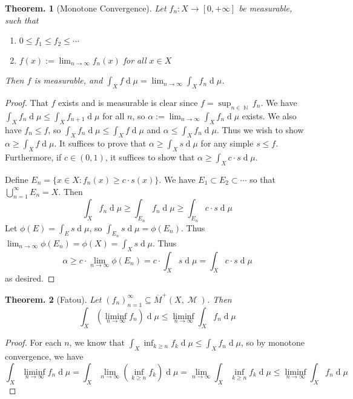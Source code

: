 \documentclass[11pt, a4paper]{memoir}
\DeclareMathOperator{\N}{{\mathbb{N}}}
\newcommand{\ol}[1]{\ensuremath{\overline{#1}}}
\theoremstyle{change}
\newtheorem{theorem}{Theorem.}[section]
\theoremstyle{plain}
\theoremstyle{nonumberplain}
\newtheorem{proof}{Proof}
\DeclareMathOperator{\M}{{\mathcal{M}}}
\renewcommand{\d}[1]{\ensuremath{\operatorname{d}\!{#1}}}
\numberwithin{equation}{section}
\begin{document}
\begin{theorem}[Monotone Convergence]
    Let $f_n:X\to[0,+\infty]$ be measurable, such that
    \begin{enumerate}[nolistsep, label=(\roman*)]
        \item $0\leq f_1\leq f_2\leq\cdots$
        \item $f(x):=\lim_{n\to\infty} f_n(x)$ for all $x\in X$
    \end{enumerate}
    Then $f$ is measurable, and $\int_X f\d{\mu}=\lim_{n\to\infty}\int_X f_n\d{\mu}$.
\end{theorem}
\begin{proof}
    That $f$ exists and is measurable is clear since $f=\sup_{n\in\N}f_n$.
    We have $\int_X f_n\d{\mu}\leq \int_X f_{n+1}\d{\mu}$ for all $n$, so $\alpha:=\lim_{n\to\infty}\int_X f_n \d{\mu}$ exists.
    We also have $f_n\leq f$, so $\int_X f_n\d{\mu}\leq \int_X f\d{\mu}$ and $\alpha\leq\int_X f_n\d{\mu}$.
    Thus we wish to show $\alpha\geq \int_Xf\d{\mu}$.
    It suffices to prove that $\alpha\geq\int_X s\d{\mu}$ for any simple $s\leq f$.
    Furthermore, if $c\in(0,1)$, it suffices to show that $\alpha\geq\int_X c\cdot s\d{\mu}$.

    Define $E_n=\{x\in X:f_n(x)\geq c\cdot s(x)\}$.
    We have $E_1\subset E_2\subset\cdots$ so that $\bigcup\limits_{n=1}^\infty E_n=X$.
    Then
    \begin{equation*}
        \int_X f_n\d{\mu} \geq \int_{E_n} f_n\d{\mu}\geq \int_{E_n} c\cdot s\d{\mu}
    \end{equation*}
    Let $\phi(E)=\int_E s\d{\mu}$, so $\int_{E_n}s\d{\mu}=\phi(E_n)$.
    Thus $\lim_{n\to\infty}\phi(E_n)=\phi(X)=\int_X s\d{\mu}$.
    Thus
    \begin{equation*}
        \alpha\geq c\cdot \lim_{n\to\infty}\phi(E_n)=c\cdot\int_X s\d{\mu}=\int_X c\cdot s\d{\mu}
    \end{equation*}
    as desired.
\end{proof}
\begin{theorem}[Fatou]
    Let $(f_n)_{n=1}^\infty\subseteq\ol{M}^+(X,\M)$.
    Then
    \begin{equation*}
        \int_X\left(\liminf_{n\to\infty}f_n\right)\d{\mu}\leq\liminf_{n\to\infty}\int_Xf_n\d{\mu}
    \end{equation*}
\end{theorem}
\begin{proof}
    For each $n$, we know that $\int_X\inf_{k\geq n}f_k\d{\mu}\leq\int_X f_n\d{\mu}$, so by monotone convergence, we have
    \begin{equation*}
        \int_X\liminf_{n\to\infty} f_n\d{\mu} = \int_X\lim_{n\to\infty}\left(\inf_{k\geq n} f_k\right)\d{\mu}=\lim_{n\to\infty}\int_X\inf_{k\geq n}f_k\d{\mu}\leq\liminf_{n\to\infty}\int_X f_n\d{\mu}
    \end{equation*}
\end{proof}
\end{document}
